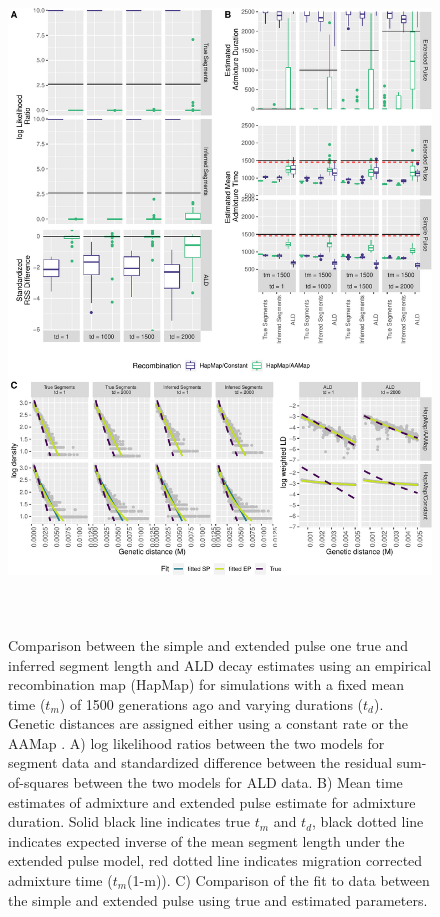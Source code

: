 \documentclass[11pt]{article}
\begin{document}
\begin{figure}
\centering
\includegraphics[width=16cm,height=18cm,keepaspectratio]{ATE_Revisions_files/figure-latex/figResult2_all_together_Supplements-1.pdf}
\caption{\label{fig:figResult2_sup} Comparison between the simple and extended pulse one true and inferred segment length and ALD decay estimates using an empirical recombination map (HapMap) for simulations with a fixed mean time ($t_m$) of 1500 generations ago and varying durations ($t_d$). Genetic distances are assigned either using a constant rate or the AAMap . A) log likelihood ratios between the two models for segment data and standardized difference between the residual sum-of-squares between the two models for ALD data. B) Mean time estimates of admixture and extended pulse estimate for admixture duration. Solid black line indicates true $t_m$ and $t_d$, black dotted line indicates expected inverse of the mean segment length under the extended pulse model, red dotted line indicates migration corrected admixture time ($t_m$(1-m)). C) Comparison of the fit to data between the simple and extended pulse using true and estimated parameters. }
\end{figure}
\end{document}
